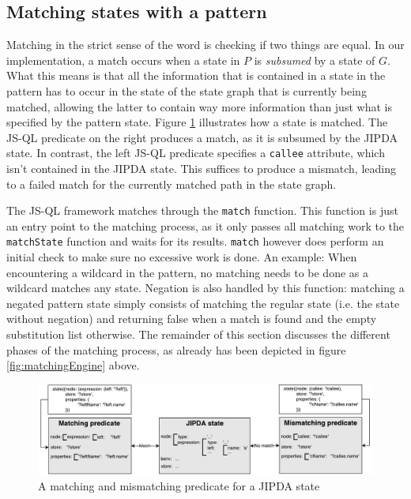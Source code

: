 \subsection{Matching states with a pattern}
\label{subsec:matching}

Matching in the strict sense of the word is checking if two things are equal. In our implementation, a match occurs when a state in $P$ is \textit{subsumed} by a state of $G$. What this means is that all the information that is contained in a state in the pattern has to occur in the state of the state graph that is currently being matched, allowing the latter to contain way more information than just what is specified by the pattern state. Figure \ref{fig:matchingPredicates} illustrates how a state is matched. The JS-QL predicate on the right produces a match, as it is subsumed by the JIPDA state. In contrast, the left JS-QL predicate specifies a \texttt{callee} attribute, which isn't contained in the JIPDA state. This suffices to produce a mismatch, leading to a failed match for the currently matched path in the state graph.

The JS-QL framework matches through the \texttt{match} function. This function is just an entry point to the matching process, as it only passes all matching work to the \texttt{matchState} function and waits for its results. \texttt{match} however does perform an initial check to make sure no excessive work is done. An example: When encountering a wildcard in the pattern, no matching needs to be done as a wildcard matches any state. Negation is also handled by this function: matching a negated pattern state simply consists of matching the regular state (i.e. the state without negation) and returning false when a match is found and the empty substitution list otherwise. The remainder of this section discusses the different phases of the matching process, as already has been depicted in figure \ref{fig:matchingEngine} above.

\begin{figure}[!h]
    \centering
      \includegraphics[width=1\textwidth]{images/matchingPredicates} 
      \caption{A matching and mismatching predicate for a JIPDA state}
    \label{fig:matchingPredicates}
\end{figure}

